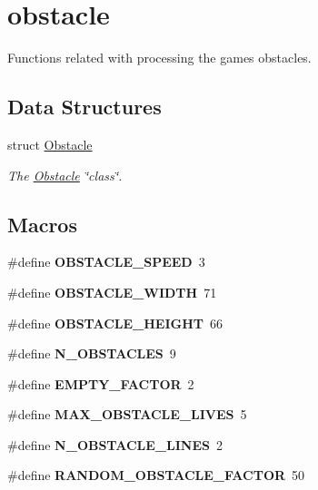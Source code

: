 \hypertarget{group__obstacle}{}\section{obstacle}
\label{group__obstacle}


Functions related with processing the game\textquotesingle{}s obstacles.  


\subsection*{Data Structures}
\begin{DoxyCompactItemize}
\item 
struct \hyperlink{struct_obstacle}{Obstacle}
\begin{DoxyCompactList}\small\item\em The \hyperlink{struct_obstacle}{Obstacle} \char`\"{}class\char`\"{}. \end{DoxyCompactList}\end{DoxyCompactItemize}
\subsection*{Macros}
\begin{DoxyCompactItemize}
\item 
\hypertarget{group__obstacle_ga552861717b7ea65a255ecf38b36caf72}{}\label{group__obstacle_ga552861717b7ea65a255ecf38b36caf72} 
\#define {\bfseries O\+B\+S\+T\+A\+C\+L\+E\+\_\+\+S\+P\+E\+ED}~3
\item 
\hypertarget{group__obstacle_gac6bd3de7feba02636654e285a35a1965}{}\label{group__obstacle_gac6bd3de7feba02636654e285a35a1965} 
\#define {\bfseries O\+B\+S\+T\+A\+C\+L\+E\+\_\+\+W\+I\+D\+TH}~71
\item 
\hypertarget{group__obstacle_ga11508d05621bcf587ed7a780813d140a}{}\label{group__obstacle_ga11508d05621bcf587ed7a780813d140a} 
\#define {\bfseries O\+B\+S\+T\+A\+C\+L\+E\+\_\+\+H\+E\+I\+G\+HT}~66
\item 
\hypertarget{group__obstacle_ga451c4c512c2c2e54ec8d7fe03feabe4c}{}\label{group__obstacle_ga451c4c512c2c2e54ec8d7fe03feabe4c} 
\#define {\bfseries N\+\_\+\+O\+B\+S\+T\+A\+C\+L\+ES}~9
\item 
\hypertarget{group__obstacle_ga4b95560a5e51c08a2a0ae1b76ba44280}{}\label{group__obstacle_ga4b95560a5e51c08a2a0ae1b76ba44280} 
\#define {\bfseries E\+M\+P\+T\+Y\+\_\+\+F\+A\+C\+T\+OR}~2
\item 
\hypertarget{group__obstacle_gaa2f0105e198589b9391e7c5523dc95e4}{}\label{group__obstacle_gaa2f0105e198589b9391e7c5523dc95e4} 
\#define {\bfseries M\+A\+X\+\_\+\+O\+B\+S\+T\+A\+C\+L\+E\+\_\+\+L\+I\+V\+ES}~5
\item 
\hypertarget{group__obstacle_gade74997d65555e68c6cc657cb8264b8e}{}\label{group__obstacle_gade74997d65555e68c6cc657cb8264b8e} 
\#define {\bfseries N\+\_\+\+O\+B\+S\+T\+A\+C\+L\+E\+\_\+\+L\+I\+N\+ES}~2
\item 
\hypertarget{group__obstacle_ga1aed4c960663550dfff2460ccdd97bb3}{}\label{group__obstacle_ga1aed4c960663550dfff2460ccdd97bb3} 
\#define {\bfseries R\+A\+N\+D\+O\+M\+\_\+\+O\+B\+S\+T\+A\+C\+L\+E\+\_\+\+F\+A\+C\+T\+OR}~50
\end{DoxyCompactItemize}
